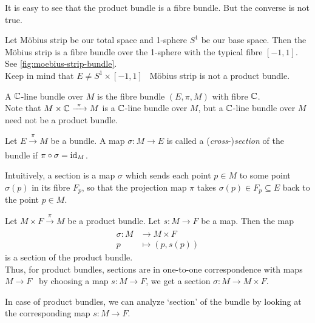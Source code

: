 It is easy to see that the product bundle is a fibre bundle. But the converse is not true.
\begin{example}
	Let M\"obius strip be our total space and 1-sphere \(S^1\) be our base space. Then the M\"obius strip is a fibre bundle over the 1-sphere with the typical fibre \([-1, 1]\). See \cref{fig:moebius-strip-bundle}.\\
	Keep in mind that \(E \ne S^1 \times [-1, 1]\) \ie\ M\"obius strip is not a product bundle.
\end{example}

\begin{example}
	A \(\mathbb C\)-line bundle over \(M\) is the fibre bundle \((E,\pi,M)\) with fibre \(\mathbb C\). \\
	Note that \(M \times \mathbb C \xrightarrow[]{\ \pi\ } M\) is a \(\mathbb C\)-line bundle over \(M\), but a \(\mathbb C\)-line bundle over \(M\) need not be a product bundle.
\end{example}

\begin{definition}[Section]
	Let \(E \xrightarrow[]{\ \pi\ } M\) be a bundle. A map \(\sigma: M \to E\) is called a (\emph{cross}-)\emph{section} of the bundle if \(\pi \circ \sigma = \operatorname{id}_M\).
\end{definition}

Intuitively, a section is a map \(\sigma\) which sends each point \(p \in M\) to some point \(\sigma(p)\) in its fibre \(F_p\), so that the projection map \(\pi\) takes \(\sigma(p) \in F_p \subseteq E\) back to the point \(p \in M\).

\begin{example}
	Let \(M \times F \xrightarrow[]{\ \pi\ } M\) be a product bundle. Let \(s: M \to F\) be a map. Then the map
	\begin{equation}
		\begin{aligned}
			\sigma: M & \to M \times F    \\
			p         & \mapsto (p, s(p))
		\end{aligned}
	\end{equation}
	is a section of the product bundle. \\
	Thus, for product bundles, sections are in one-to-one correspondence with maps \(M \to F\) \ie\ by choosing a map \(s: M \to F\), we get a section \(\sigma: M \to M \times F\).
\end{example}
In case of product bundles, we can analyze `section' of the bundle by looking at the corresponding map \(s: M \to F\).

